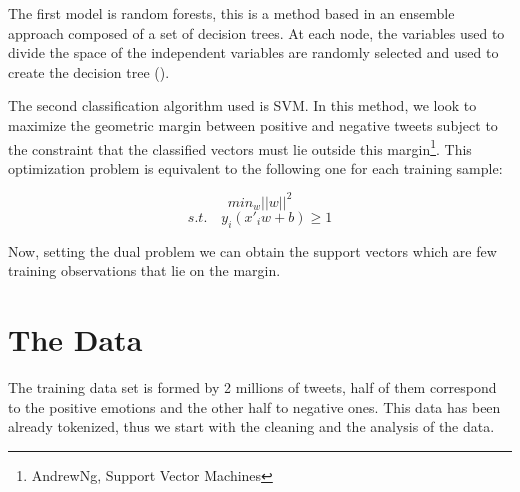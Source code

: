 \documentclass[10pt,conference,compsocconf]{IEEEtran}
\begin{document}
The first model is random forests, this is a method based in an ensemble approach composed of a set of decision trees. At each node, the variables used to divide the space of the independent variables are randomly selected and used to create the decision tree (\cite{breiman2001random}). 

The second classification algorithm used is SVM. In this method, we look to maximize the geometric margin between positive and negative tweets subject to the constraint that the classified vectors must lie outside this margin\footnote{AndrewNg, Support Vector Machines}. This optimization problem is equivalent to the following one for each training sample:

$$min_w || w ||^2$$
$$s.t. \quad y_i(x'_iw +b)\geq 1$$

 Now, setting the dual problem we can obtain the support vectors which are few training observations that lie on the margin. 
 



\section{The Data}
\label{S3}

The training data set is formed by 2 millions of tweets, half of them correspond to the positive emotions and the other half to negative ones. This data has been already tokenized, thus we start with the cleaning and the analysis of the data.  


\end{document}

